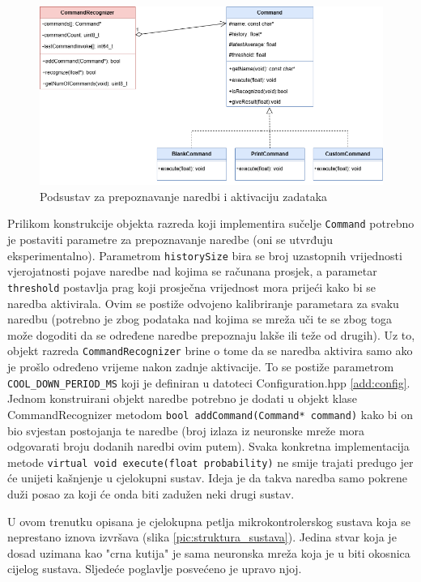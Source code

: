 \begin{figure}[htb]
    \centering
    \includegraphics[width=0.9\linewidth]{Chapters/struktura_sustava/prepoznavanje_naredbi/commands.png} 
    \caption{Podsustav za prepoznavanje naredbi i aktivaciju zadataka\cite{flowchart}}
    \label{pic:uml}
\end{figure}

Prilikom konstrukcije objekta razreda koji implementira sučelje \texttt{Command} potrebno je postaviti
parametre za prepoznavanje naredbe (oni se utvrđuju eksperimentalno). Parametrom \texttt{historySize}
bira se broj uzastopnih vrijednosti vjerojatnosti pojave naredbe nad kojima se računana prosjek,
a parametar \texttt{threshold} postavlja prag koji prosječna vrijednost mora prijeći kako bi se naredba
aktivirala. Ovim se postiže odvojeno kalibriranje parametara za svaku naredbu (potrebno
je zbog podataka nad kojima se mreža uči te se zbog toga može dogoditi da se određene
naredbe prepoznaju lakše ili teže od drugih).
Uz to, objekt razreda \texttt{CommandRecognizer} brine o tome da se naredba aktivira
samo ako je prošlo određeno vrijeme nakon zadnje aktivacije. To se postiže parametrom 
\texttt{COOL\_DOWN\_PERIOD\_MS} koji je definiran u datoteci Configuration.hpp \ref{add:config}.
Jednom konstruirani objekt naredbe potrebno je dodati 
u objekt klase CommandRecognizer metodom \texttt{bool addCommand(Command* command)} 
kako bi on bio svjestan postojanja te naredbe (broj izlaza iz neuronske mreže mora odgovarati 
broju dodanih naredbi ovim putem). Svaka konkretna implementacija metode 
\texttt{virtual void execute(float probability)} ne smije trajati predugo jer će unijeti 
kašnjenje u cjelokupni sustav. Ideja je da takva naredba samo pokrene duži posao za koji će onda
biti zadužen neki drugi sustav.

U ovom trenutku opisana je cjelokupna petlja mikrokontrolerskog sustava
koja se neprestano iznova izvršava (slika \ref{pic:struktura_sustava}).
Jedina stvar koja je dosad uzimana kao "crna kutija" je sama neuronska mreža koja
je u biti okosnica cijelog sustava. Sljedeće poglavlje posvećeno je upravo njoj.